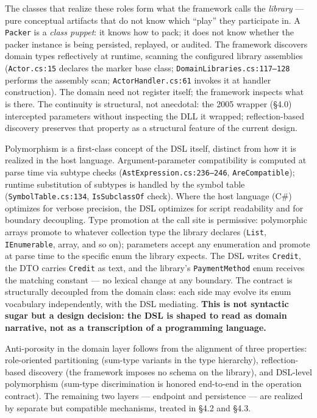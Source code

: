 \documentclass[
]{article}
\let\origtexttt\texttt%
\renewcommand{\texttt}[1]{\origtexttt{\seqsplit{#1}}}%
\let\texttt\origtexttt%
\begin{document}
The classes that realize these roles form what the framework calls the
\emph{library} --- pure conceptual artifacts that do not know which
``play'' they participate in. A \texttt{Packer} is a \emph{class
puppet}: it knows how to pack; it does not know whether the packer
instance is being persisted, replayed, or audited. The framework
discovers domain types reflectively at runtime, scanning the configured
library assemblies (\texttt{Actor.cs:15} declares the marker base class;
\texttt{DomainLibraries.cs:117–128} performs the assembly scan;
\texttt{ActorHandler.cs:61} invokes it at handler construction). The
domain need not register itself; the framework inspects what is there.
The continuity is structural, not anecdotal: the 2005 wrapper (§4.0)
intercepted parameters without inspecting the DLL it wrapped;
reflection-based discovery preserves that property as a structural
feature of the current design.

Polymorphism is a first-class concept of the DSL itself, distinct from
how it is realized in the host language. Argument-parameter
compatibility is computed at parse time via subtype checks
(\texttt{AstExpression.cs:236–246}, \texttt{AreCompatible}); runtime
substitution of subtypes is handled by the symbol table
(\texttt{SymbolTable.cs:134}, \texttt{IsSubclassOf} check). Where the
host language (C\#) optimizes for verbose precision, the DSL optimizes
for script readability and for boundary decoupling. Type promotion at
the call site is permissive: polymorphic arrays promote to whatever
collection type the library declares (\texttt{List},
\texttt{IEnumerable}, array, and so on); parameters accept any
enumeration and promote at parse time to the specific enum the library
expects. The DSL writes \texttt{Credit}, the DTO carries \texttt{Credit}
as text, and the library's \texttt{PaymentMethod} enum receives the
matching constant --- no lexical change at any boundary. The contract is
structurally decoupled from the domain class: each side may evolve its
enum vocabulary independently, with the DSL mediating. \textbf{This is
not syntactic sugar but a design decision: the DSL is shaped to read as
domain narrative, not as a transcription of a programming language.}

Anti-porosity in the domain layer follows from the alignment of three
properties: role-oriented partitioning (sum-type variants in the type
hierarchy), reflection-based discovery (the framework imposes no schema
on the library), and DSL-level polymorphism (sum-type discrimination is
honored end-to-end in the operation contract). The remaining two layers
--- endpoint and persistence --- are realized by separate but compatible
mechanisms, treated in §4.2 and §4.3.
\end{document}
